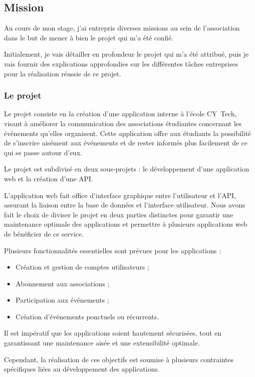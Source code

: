 \subsection{Mission}

Au cours de mon stage, j'ai entrepris diverses missions au sein de l'association dans le but de mener à bien le projet qui m'a été confié.

Initialement, je vais détailler en profondeur le projet qui m'a été attribué, puis je vais fournir des explications approfondies sur les différentes tâches entreprises pour la réalisation réussie de ce projet.

\subsubsection{Le projet}

Le projet consiste en la création d'une application interne à l'école CY~Tech, visant à améliorer la communication des associations étudiantes concernant les événements qu'elles organisent. Cette application offre aux étudiants la possibilité de s'inscrire aisément aux événements et de rester informés plus facilement de ce qui se passe autour d'eux.

Le projet est subdivisé en deux sous-projets : le développement d'une application web et la création d'une API.

L'application web fait office d'interface graphique entre l'utilisateur et l'API, assurant la liaison entre la base de données et l'interface utilisateur. Nous avons fait le choix de diviser le projet en deux parties distinctes pour garantir une maintenance optimale des applications et permettre à plusieurs applications web de bénéficier de ce service.

Plusieurs fonctionnalités essentielles sont prévues pour les applications :
\begin{itemize}
	\item Création et gestion de comptes utilisateurs ;
	\item Abonnement aux associations ;
	\item Participation aux événements ;
	\item Création d'événements ponctuels ou récurrents.
\end{itemize}

Il est impératif que les applications soient hautement sécurisées, tout en garantissant une maintenance aisée et une extensibilité optimale.

Cependant, la réalisation de ces objectifs est soumise à plusieurs contraintes spécifiques liées au développement des applications.

